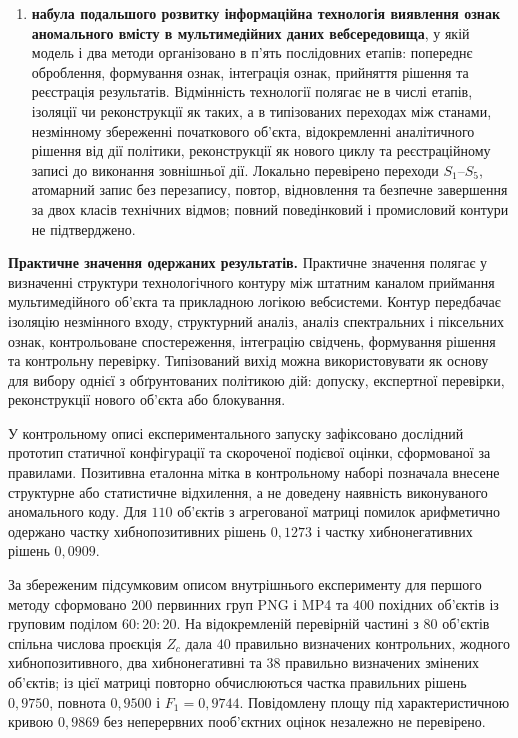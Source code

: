 \begin{enumerate}[label=\arabic*)]
\item \textbf{набула подальшого розвитку інформаційна технологія виявлення ознак аномального вмісту в мультимедійних даних вебсередовища}, у якій модель і два методи організовано в п’ять послідовних етапів: попереднє оброблення, формування ознак, інтеграція ознак, прийняття рішення та реєстрація результатів. Відмінність технології полягає не в числі етапів, ізоляції чи реконструкції як таких, а в типізованих переходах між станами, незмінному збереженні початкового об’єкта, відокремленні аналітичного рішення від дії політики, реконструкції як нового циклу та реєстраційному записі до виконання зовнішньої дії. Локально перевірено переходи $S_1$--$S_5$, атомарний запис без перезапису, повтор, відновлення та безпечне завершення за двох класів технічних відмов; повний поведінковий і промисловий контури не підтверджено.
\end{enumerate}

\textbf{Практичне значення одержаних результатів.}
Практичне значення полягає у визначенні структури технологічного контуру між штатним каналом приймання мультимедійного об’єкта та прикладною логікою вебсистеми. Контур передбачає ізоляцію незмінного входу, структурний аналіз, аналіз спектральних і піксельних ознак, контрольоване спостереження, інтеграцію свідчень, формування рішення та контрольну перевірку. Типізований вихід можна використовувати як основу для вибору однієї з обґрунтованих політикою дій: допуску, експертної перевірки, реконструкції нового об’єкта або блокування.

У контрольному описі експериментального запуску зафіксовано дослідний прототип статичної конфігурації та скороченої подієвої оцінки, сформованої за правилами. Позитивна еталонна мітка в контрольному наборі позначала внесене структурне або статистичне відхилення, а не доведену наявність виконуваного аномального коду. Для $110$ об’єктів з агрегованої матриці помилок арифметично одержано частку хибнопозитивних рішень $0{,}1273$ і частку хибнонегативних рішень $0{,}0909$.

За збереженим підсумковим описом внутрішнього експерименту для першого методу сформовано $200$ первинних груп PNG і MP4 та $400$ похідних об’єктів із груповим поділом $60:20:20$. На відокремленій перевірній частині з $80$ об’єктів спільна числова проєкція $Z_c$ дала $40$ правильно визначених контрольних, жодного хибнопозитивного, два хибнонегативні та $38$ правильно визначених змінених об’єктів; із цієї матриці повторно обчислюються частка правильних рішень $0{,}9750$, повнота $0{,}9500$ і $F_1=0{,}9744$. Повідомлену площу під характеристичною кривою $0{,}9869$ без неперервних пооб’єктних оцінок незалежно не перевірено.

